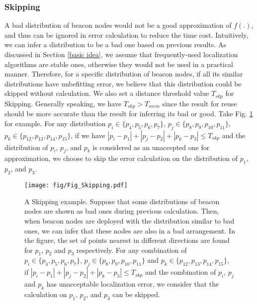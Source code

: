 \documentclass[10pt, conference, letterpaper]{IEEEtran}
\begin{document}
\subsubsection{Skipping} \label{skipping}
A bad distribution of beacon nodes would not be a good approximation of $f(.)$, and thus can be ignored in error calculation to reduce the time cost. Intuitively, we can infer a distribution to be a bad one based on previous results. As discussed in Section \ref{basic idea}, we assume that frequently-used localization algorithms are stable ones, otherwise they would not be used in a practical manner. Therefore, for a specific distribution of beacon nodes, if all its similar distributions have unbefitting error, we believe that this distribution could be skipped without calculation. We also set a distance threshold value $T_{skp}$ for Skipping. Generally speaking, we have $T_{skp}>T_{mem}$ since the result for reuse should be more accurate than the result for inferring its bad or good. Take Fig. \ref{Fig_Skipping} for example. For any distribution $p_i \in \{p_4,p_5,p_6,p_7\}$, $p_j \in \{p_8,p_9,p_{10},p_{11}\}$, $p_k \in \{p_{12},p_{13},p_{14},p_{15}\}$, if we have $|p_i-p_1|+|p_j-p_2|+|p_k-p_3| \leq T_{skp}$ and the distribution of $p_i$, $p_j$, and $p_k$ is considered as an unaccepted one for approximation, we choose to skip the error calculation on the distribution of $p_1$, $p_2$, and $p_3$.
\begin{figure}
\centering
\texttt{[image: fig/Fig\_Skipping.pdf]}\\
\caption{\textrm{A Skipping example. Suppose that some distributions of beacon nodes are shown as bad ones during previous calculation. Then, when beacon nodes are deployed with the distribution similar to bad ones, we can infer that these nodes are also in a bad arrangement. In the figure, the set of points nearest in different directions are found for $p_1$, $p_2$ and $p_3$ respectively. For any combination of $p_i \in \{p_4,p_5,p_6,p_7\}$, $p_j \in \{p_8,p_9,p_{10},p_{11}\}$ and $p_k \in \{p_{12},p_{13},p_{14},p_{15}\}$, if $|p_i-p_1|+|p_j-p_2|+|p_k-p_3| \leq T_{skp}$ and the combination of $p_i$, $p_j$ and $p_k$ has unacceptable localization error, we consider that the calculation on $p_1$, $p_2$, and $p_3$ can be skipped.}} \label{Fig_Skipping}
\end{figure}
\end{document}
